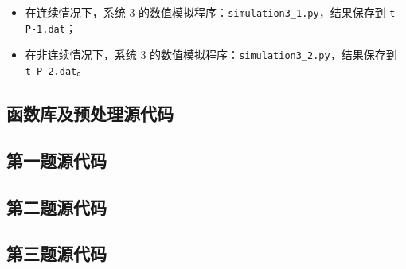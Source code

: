 \documentclass[withoutpreface,bwprint]{cumcmthesis}
\begin{document}
\begin{appendices}
\begin{enumerate}
	\begin{itemize}
		\item 在连续情况下，系统 3 的数值模拟程序：\verb|simulation3_1.py|，结果保存到 \newline \verb|t-P-1.dat|；
		\item 在非连续情况下，系统 3 的数值模拟程序：\verb|simulation3_2.py|，结果保存到 \newline \verb|t-P-2.dat|。
	\end{itemize}
\end{enumerate}
\subsection{函数库及预处理源代码}







\subsection{第一题源代码}







\subsection{第二题源代码}



\subsection{第三题源代码}





\end{appendices}
\end{document}
